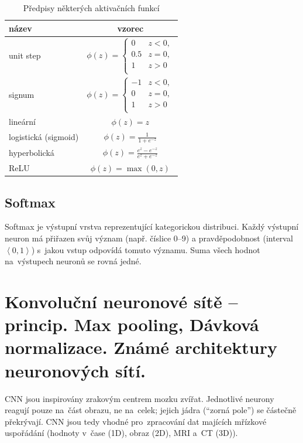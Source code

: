 \begin{table}[ht]
\onehalfspacing
\centering
\begin{tabular}{|l|c|}
    název & vzorec \\ \hline \hline
    unit step & $\phi(z) = \begin{cases}
    0 & z < 0, \\
    0.5 & z = 0, \\
    1 & z > 0 \\
    \end{cases}$ \\
    signum & $\phi(z) = \begin{cases}
    -1 & z < 0, \\
    0 & z = 0, \\
    1 & z > 0 \\
    \end{cases}$ \\
    lineární & $\phi(z) = z$ \\
    logistická (sigmoid) & $\phi(z) = \frac{1}{1 + e^{-z}}$ \\
    hyperbolická & $\phi(z) = \frac{e^z - e^{-z}}{e^z + e^{-z}}$ \\
    ReLU & $\phi(z) = \max(0, z)$ \\
\end{tabular}
\caption{Předpisy některých aktivačních funkcí}
\end{table}
\FloatBarrier

\subsection{Softmax}

Softmax je výstupní vrstva reprezentující kategorickou distribuci.
Každý výstupní neuron má přiřazen svůj význam (např. číslice 0--9) a pravděpodobnost (interval $\left<0, 1\right>$) s~jakou vstup odpovídá tomuto významu.
Suma všech hodnot na~výstupech neuronů se rovná jedné.

\clearpage
\section{Konvoluční neuronové sítě – princip. Max pooling, Dávková normalizace. Známé architektury neuronových sítí.}

CNN jsou inspirovány zrakovým centrem mozku zvířat.
Jednotlivé neurony reagují pouze na~část obrazu, ne na~celek; jejich jádra (\enquote{zorná pole}) se částečně překrývají.
CNN jsou tedy vhodné pro~zpracování dat majících mřízkové uspořádání (hodnoty v~čase (1D), obraz (2D), MRI a~CT (3D)).

